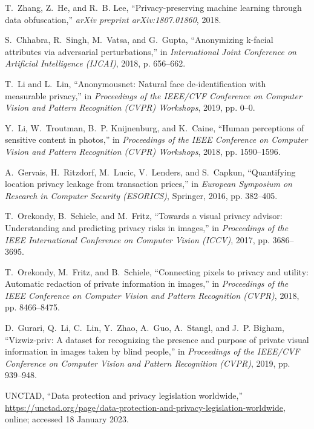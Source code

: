 \documentclass[journal]{IEEEtran}
\begin{document}
\begin{thebibliography}{100}
T.~Zhang, Z.~He, and R.~B. Lee, ``Privacy-preserving machine learning through data obfuscation,'' \emph{arXiv preprint arXiv:1807.01860}, 2018.

S.~Chhabra, R.~Singh, M.~Vatsa, and G.~Gupta, ``Anonymizing k-facial attributes via adversarial perturbations,'' in \emph{International Joint Conference on Artificial Intelligence (IJCAI)}, 2018, p. 656–662.

T.~Li and L.~Lin, ``Anonymousnet: Natural face de-identification with measurable privacy,'' in \emph{Proceedings of the IEEE/CVF Conference on
Computer Vision and Pattern Recognition (CVPR) Workshops}, 2019, pp. 0--0.

Y.~Li, W.~Troutman, B.~P. Knijnenburg, and K.~Caine, ``Human perceptions of
sensitive content in photos,'' in \emph{Proceedings of the IEEE Conference on Computer Vision and Pattern Recognition (CVPR) Workshops}, 2018, pp. 1590--1596.

A.~Gervais, H.~Ritzdorf, M.~Lucic, V.~Lenders, and S.~Capkun, ``Quantifying location privacy leakage from transaction prices,'' in \emph{European Symposium on Research in Computer Security (ESORICS)}, Springer, 2016, pp. 382--405.

T.~Orekondy, B.~Schiele, and M.~Fritz, ``Towards a visual privacy advisor:
Understanding and predicting privacy risks in images,'' in \emph{Proceedings of the IEEE International Conference on Computer Vision (ICCV)}, 2017, pp. 3686--3695.

T.~Orekondy, M.~Fritz, and B.~Schiele, ``Connecting pixels to privacy and
utility: Automatic redaction of private information in images,'' in
\emph{Proceedings of the IEEE Conference on Computer Vision and Pattern Recognition (CVPR)}, 2018, pp. 8466--8475.

D.~Gurari, Q.~Li, C.~Lin, Y.~Zhao, A.~Guo, A.~Stangl, and J.~P. Bigham,
``Vizwiz-priv: A dataset for recognizing the presence and purpose of private visual information in images taken by blind people,'' in \emph{Proceedings of
the IEEE/CVF Conference on Computer Vision and Pattern Recognition (CVPR)}, 2019, pp. 939--948.

UNCTAD, ``Data protection and privacy legislation worldwide,''
\url{https://unctad.org/page/data-protection-and-privacy-legislation-worldwide},
online; accessed 18 January 2023.


\end{thebibliography}
\end{document}
